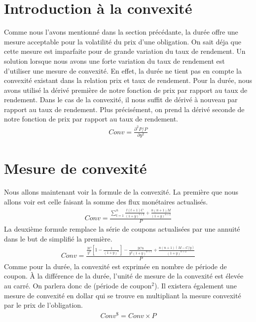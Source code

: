 \documentclass[12pt]{article}
\begin{document}
\section{Introduction à la convexité}
Comme nous l'avons mentionné dans la section précédante, la durée offre une mesure acceptable pour la volatilité du prix d'une obligation. On sait déja que cette mesure est imparfaite pour de grande variation du taux de rendement. Un solution lorsque nous avons une forte variation du taux de rendement est d'utiliser une mesure de convexité. En effet, la durée ne tient pas en compte la convexité existant dans la relation prix et taux de rendement. Pour la durée, nous avons utilisé la dérivé première de notre fonction de prix par rapport au taux de rendement. Dans le cas de la convexité, il nous suffit de dérivé à nouveau par rapport au taux de rendement. Plus précisément, on prend la dérivé seconde de notre fonction de prix par rapport au taux de rendement.
\begin{align*}
Conv=\frac{\partial^2P /P}{\partial y^2}
\end{align*}
\section{Mesure de convexité}
Nous allons maintenant voir la formule de la convexité. La première que nous allons voir est celle faisant la somme des flux monétaires actualisés. 
\begin{align*}
Conv=\frac{\sum_{t=1}^n \frac{t(t+1)C}{(1+y)^{t+2}}+\frac{n(n+1)M}{(1+y)^{n+2}}}{P}
\end{align*}
La deuxième formule remplace la série de coupons actualisées par une annuité dans le but de simplifié la première.
\begin{align*}
Conv=\frac{\frac{2C}{y^3} \left[1-\frac{1}{(1+y)^n} \right] -\frac{2Cn}{y^2(1+y)^{n+1}}+\frac{n(n+1)(M-C/y)}{(1+y)^{n+2}}}{P}
\end{align*}
Comme pour la durée,  la convexité est exprimée en nombre de période de coupon.  À la différence de la durée,  l'unité de mesure de la convexité est élevée au carré.  On parlera donc de (période de coupon$^2$).  Il existera également une mesure de convexité en dollar qui se trouve en multipliant la mesure convexité par le prix de l'obligation.
\begin{align*}
Conv^{\$}=Conv \times P
\end{align*}
\end{document}
